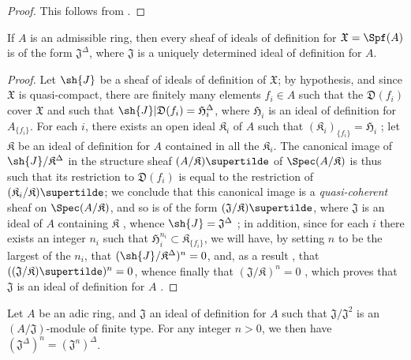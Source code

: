 \begin{proof}
This follows from .
\end{proof}

\begin{proposition}[10.3.5]
\label{I.10.3.5}
If $A$ is an admissible ring, then every sheaf of ideals of definition for $\mathfrak{X}=\Spf(A)$ is of the form $\mathfrak{J}^\Delta$, where $\mathfrak{J}$ is a uniquely determined ideal of definition for $A$.
\end{proposition}

\begin{proof}
Let $\sh{J}$ be a sheaf of ideals of definition of $\mathfrak{X}$; by hypothesis, and since $\mathfrak{X}$ is quasi-compact, there are finitely many elements $f_i\in A$ such that the $\mathfrak{D}(f_i)$ cover $\mathfrak{X}$ and such that $\sh{J}|\mathfrak{D}(f_i)=\mathfrak{H}_i^\Delta$, where $\mathfrak{H}_i$ is an ideal of definition for $A_{\{f_i\}}$.
For each $i$, there exists an open ideal $\mathfrak{K}_i$ of $A$ such that $(\mathfrak{K}_i)_{\{f_i\}}=\mathfrak{H}_i$ ; let $\mathfrak{K}$ be an ideal of definition for $A$ contained in all the $\mathfrak{K}_i$.
The canonical image of $\sh{J}/\mathfrak{K}^\Delta$ in the structure sheaf $(A/\mathfrak{K})\supertilde$ of $\Spec(A/\mathfrak{K})$  is thus such that its restriction to $\mathfrak{D}(f_i)$ is equal to the restriction of $(\mathfrak{K}_i/\mathfrak{K})\supertilde$;
we conclude that this canonical image is a \emph{quasi-coherent} sheaf on $\Spec(A/\mathfrak{K})$, and so is of the form $(\mathfrak{J}/\mathfrak{K})\supertilde$, where $\mathfrak{J}$ is an ideal of $A$ containing $\mathfrak{K}$ , whence $\sh{J}=\mathfrak{J}^\Delta$ ;
in addition, since for each $i$ there exists an integer $n_i$ such that $\mathfrak{H}_i^{n_i}\subset\mathfrak{K}_{\{f_i\}}$, we will have, by setting $n$ to be the largest of the $n_i$, that $(\sh{J}/\mathfrak{K}^\Delta)^n=0$, and, as a result , that $((\mathfrak{J}/\mathfrak{K})\supertilde)^n=0$, whence finally that $(\mathfrak{J}/\mathfrak{K})^n=0$ , which proves that $\mathfrak{J}$ is an ideal of definition for $A$ .
\end{proof}

\begin{proposition}[10.3.6]
\label{I.10.3.6}
Let $A$ be an adic ring, and $\mathfrak{J}$ an ideal of definition for $A$ such that $\mathfrak{J}/\mathfrak{J}^2$ is an $(A/\mathfrak{J})$-module of finite type. For any integer $n>0$, we then have $(\mathfrak{J}^\Delta)^n=(\mathfrak{J}^n)^\Delta$.
\end{proposition}


